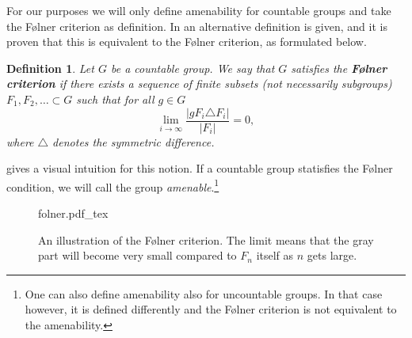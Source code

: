 \documentclass[titlepage, a4paper]{article}
\newcommand{\N}{\mathbb{N}}
\newcommand{\card}[1]{\left| #1 \right|}
\newtheorem{definition}[theorem]{Definition}
\theoremstyle{remark}
\newcommand{\incfig}[1]{%
    \def\svgwidth{.5\columnwidth}
    {#1.pdf_tex}
}
\begin{document}
    For our purposes we will only define amenability for countable groups and take the Følner criterion as definition. In \cite[subsection 4.1]{kerr_li_ergodic_theory} an alternative definition is given, and it is proven that this is equivalent to the Følner criterion, as formulated below.
	
    \begin{definition}\label{def:folner} 
	    Let $G$ be a countable group. We say that $G$ satisfies the \textbf{Følner criterion} if there exists a sequence of finite subsets (not necessarily subgroups) $F_1, F_2, \dots \subset G$ such that for all $g \in G$ 
        \[
        \lim_{i\to \infty} \frac{\card{gF_i \triangle F_i}}{\card{F_i}} = 0,
        \]
        where $\triangle$ denotes the symmetric difference.
    \end{definition}
     gives a visual intuition for this notion. 
    If a countable group statisfies the Følner condition, we will call the group \emph{amenable}.\footnote{One can also define amenability also for uncountable groups. In that case however, it is defined differently and the Følner criterion is not equivalent to the amenability.} 

\begin{figure}[ht]
    \centering
    \incfig{folner}
    \caption{An illustration of the Følner criterion. The limit means that the gray part will become very small compared to  $F_n$ itself as $n$ gets large.}
    \label{fig:folner}
\end{figure}
\end{document}
